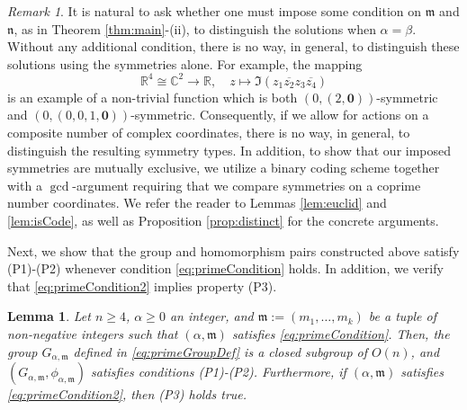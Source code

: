 \documentclass[10pt, reqno]{amsart}
\newcommand{\RR}{\mathbb{R}}
\newcommand{\CC}{\mathbb{C}}
\newcommand{\m}{\mathfrak{m}}
\newcommand{\n}{\mathfrak{n}}
\numberwithin{equation}{section}
\theoremstyle{definition}
\theoremstyle{remark}
\newtheorem{rem}{Remark}[section]
\theoremstyle{plain}
\newtheorem{lem}[prop]{Lemma}
\begin{document}
	\begin{rem}\label{rem:counterExample}
		It is natural to ask whether one must impose some condition on $\m$ and $\n$, as in Theorem \ref{thm:main}-(ii), to distinguish the solutions when $\alpha = \beta$.  Without any additional condition, there is no way, in general, to distinguish these solutions using the symmetries alone. For example, the mapping
		\[
		\RR^4 \cong \CC^2 \to \RR, \quad z \mapsto \Im\left( z_1\overline{z_2}z_3\overline{z_4} \right)
		\]
		is an example of a non-trivial function which is both $(0,(2,\mathbf{0}))$-symmetric and $(0,(0,0,1,\mathbf{0}))$-symmetric. Consequently, if we allow for actions on a composite number of complex coordinates, there is no way, in general, to distinguish the resulting symmetry types. In addition, to show that our imposed symmetries are mutually exclusive, we utilize a binary coding scheme together with a $\gcd$-argument requiring that we compare symmetries on a coprime number coordinates. We refer the reader to Lemmas \ref{lem:euclid} and \ref{lem:isCode}, as well as Proposition \ref{prop:distinct} for the concrete arguments.
	\end{rem}
	
	Next, we show that the group and homomorphism pairs constructed above satisfy (P1)-(P2) whenever condition \eqref{eq:primeCondition} holds. In addition, we verify that \eqref{eq:primeCondition2} implies property (P3). 
	
	\begin{lem}\label{lem:primeConstruct}
		Let $n \ge 4$, $\alpha \ge 0$ an integer, and $\m := (m_1,\dots, m_k)$ be a tuple of non-negative integers such that $(\alpha, \m)$ satisfies \eqref{eq:primeCondition}. Then, the group $G_{\alpha,\m}$ defined in \eqref{eq:primeGroupDef} is a closed subgroup of $O(n)$, and $(G_{\alpha,\m}, \phi_{\alpha,\m})$ satisfies conditions (P1)-(P2). Furthermore, if $(\alpha,\m)$ satisfies \eqref{eq:primeCondition2}, then (P3) holds true.
	\end{lem}
	
\end{document}
